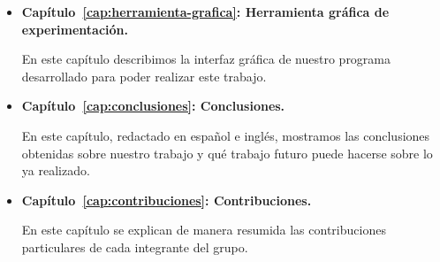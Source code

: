 \begin{itemize}
\item \textbf{Capítulo~\ref{cap:herramienta-grafica}: Herramienta gráfica de experimentación.}

En este capítulo describimos la interfaz gráfica de nuestro programa desarrollado para poder realizar este trabajo.

\item \textbf{Capítulo~\ref{cap:conclusiones}: Conclusiones.}

En este capítulo, redactado en español e inglés, mostramos las conclusiones obtenidas sobre nuestro trabajo y qué trabajo futuro puede hacerse sobre lo ya realizado. 

\item \textbf{Capítulo~\ref{cap:contribuciones}: Contribuciones.}

En este capítulo se explican de manera resumida las contribuciones particulares de cada integrante del grupo.

\end{itemize}
